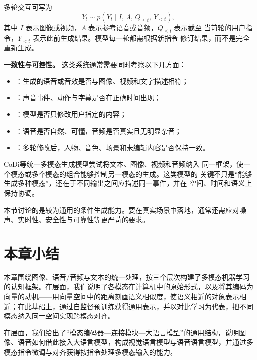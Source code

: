 多轮交互可写为
\begin{equation}
  Y_t
  \sim
  p\!\left(
    Y_t
    \mid
    I,\,
    A,\,
    Q_{\leq t},\,
    Y_{<t}
  \right),
\end{equation}
其中 $I$ 表示图像或视频，$A$ 表示参考语音或音频，$Q_{\leq t}$ 表示截至
当前轮的用户指令，$Y_{<t}$ 表示此前生成结果。模型每一轮都需根据新指令
修订结果，而不是完全重新生成。

\noindent\textbf{一致性与可控性。}
这类系统通常需要同时考察以下几方面：

\begin{itemize}
  \item {}：生成的语音或音效是否与图像、视频和文字描述相符；
  \item {}：声音事件、动作与字幕是否在正确时间出现；
  \item {}：模型是否只修改用户指定的内容；
  \item {}：语音是否自然、可懂，音频是否真实且无明显杂音；
  \item {}：多轮修改后，人物、音色、场景和未编辑内容是否保持一致。
\end{itemize}

CoDi\cite{codi}等统一多模态生成模型尝试将文本、图像、视频和音频纳入
同一框架，使一个模态或多个模态的组合能够控制另一模态的生成。这类模型的
关键不只是“能够生成多种模态”，还在于不同输出之间应描述同一事件，并在
空间、时间和语义上保持协调。

\begin{importantnote}
  本节讨论的是较为通用的条件生成能力。要在真实场景中落地，通常还需应对噪声、实时性、安全性与可靠性等更严苛的要求。
\end{importantnote}


\section{本章小结}

本章围绕图像、语音/音频与文本的统一处理，按三个层次构建了多模态机器学习的认知框架。在层面，我们说明了各模态在计算机中的原始形式，以及将其编码为向量的动机——用向量空间中的距离刻画语义相似度，使语义相近的对象表示相近；在此基础上，通过自监督预训练获得通用表示，并以对比学习为代表，把不同模态纳入同一空间实现跨模态对齐。

在层面，我们给出了“模态编码器—连接模块—大语言模型”的通用结构，说明图像、语音如何借此接入大语言模型，构成视觉语言模型与语音语言模型，并通过多模态指令微调与对齐获得按指令处理多模态输入的能力。

